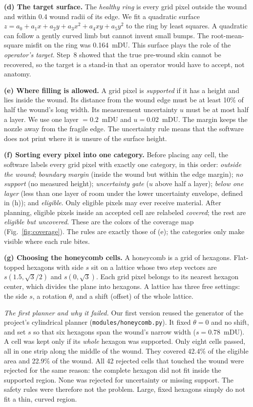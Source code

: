 \documentclass[conference]{IEEEtran}
\begin{document}
\textbf{(d) The target surface.} The \emph{healthy ring} is every grid
pixel outside the wound and within 0.4 wound radii of its edge. We fit a
quadratic surface
$z = a_0 + a_1x + a_2y + a_3x^2 + a_4xy + a_5y^2$ to the ring by least
squares. A quadratic can follow a gently curved limb but cannot invent
small bumps. The root-mean-square misfit on the ring was 0.164~mDU. This
surface plays the role of the \emph{operator's target}. Step~8 showed that
the true pre-wound skin cannot be recovered, so the target is a stand-in
that an operator would have to accept, not anatomy.

\textbf{(e) Where filling is allowed.} A grid pixel is \emph{supported} if
it has a height and lies inside the wound. Its distance from the wound edge
must be at least 10\% of half the wound's long width. Its measurement
uncertainty $u$ must be at most half a layer. We use one layer
$=0.2$~mDU and $u=0.02$~mDU. The margin keeps the nozzle away from the
fragile edge. The uncertainty rule means that the software does not print
where it is unsure of the surface height.

\textbf{(f) Sorting every pixel into one category.} Before placing any
cell, the software labels every grid pixel with exactly one category, in
this order: \emph{outside the wound}; \emph{boundary margin} (inside the
wound but within the edge margin); \emph{no support} (no measured height);
\emph{uncertainty gate} ($u$ above half a layer); \emph{below one layer}
(less than one layer of room under the lower uncertainty envelope, defined
in (h)); and \emph{eligible}. Only eligible pixels may ever receive
material. After planning, eligible pixels inside an accepted cell are
relabeled \emph{covered}; the rest are \emph{eligible but uncovered}. These
are the colors of the coverage map (Fig.~\ref{fig:coverage}). The rules are
exactly those of (e); the categories only make visible where each rule
bites.

\textbf{(g) Choosing the honeycomb cells.} A honeycomb is a grid of
hexagons. Flat-topped hexagons with side $s$ sit on a lattice whose two
step vectors are $s(1.5,\sqrt3/2)$ and $s(0,\sqrt3)$. Each grid pixel
belongs to its nearest hexagon center, which divides the plane into
hexagons. A lattice has three free settings: the side $s$, a rotation
$\theta$, and a shift (offset) of the whole lattice.

\emph{The first planner and why it failed.} Our first version reused the
generator of the project's cylindrical planner (\texttt{modules/honeycomb.py}).
It fixed $\theta=0$ and no shift, and set $s$ so that six hexagons span the
wound's narrow width ($s=0.78$~mDU). A cell was kept only if its
\emph{whole} hexagon was supported. Only eight cells passed, all in one
strip along the middle of the wound. They covered 42.4\% of the eligible
area and 22.9\% of the wound. All 42 rejected cells that touched the wound
were rejected for the same reason: the complete hexagon did not fit inside
the supported region. None was rejected for uncertainty or missing support.
The safety rules were therefore not the problem. Large, fixed hexagons simply
do not fit a thin, curved region.
\end{document}
